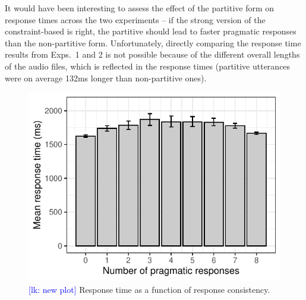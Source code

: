 \documentclass[10pt,letterpaper]{article}
\newcommand{\lk}[1]{\textcolor{Blue}{[lk: #1]}}
\begin{document}
It would have been interesting to assess the effect of the partitive form on response times across the two experiments -- if the strong version of the constraint-based is right, the partitive should lead to faster pragmatic responses than the non-partitive form. Unfortunately, directly comparing the response time results from Exps.~1 and 2 is not  possible because of the different overall lengths of the audio files, which is reflected in the response times (partitive utterances were on average 132ms longer than non-partitive ones).

\begin{figure}
  \centering
    \includegraphics[width=\columnwidth]{plots/consistency}
    \caption{\lk{new plot} Response time as a function of response consistency.}
    \label{fig:consistency}
  \end{figure}

\end{document}
